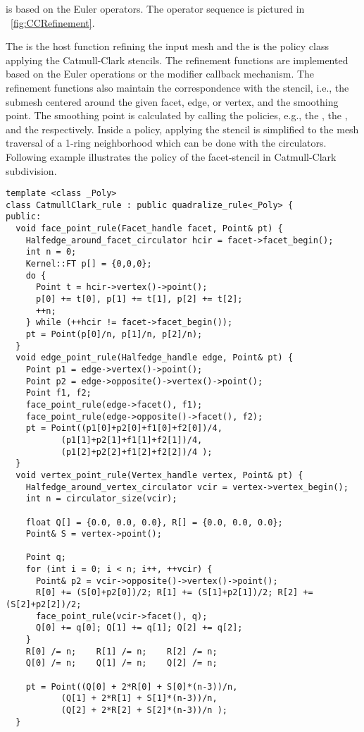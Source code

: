  is based on the Euler
operators. The operator sequence is pictured in 
\figurename\ \ref{fig:CCRefinement}.


The  
is the host function refining the input mesh
and the  is the policy 
class applying the Catmull-Clark stencils.
The refinement functions are implemented based on the
Euler operations or the modifier callback mechanism.
The refinement functions also maintain the 
correspondence with the stencil, i.e., the submesh 
centered around the given facet, edge, or
vertex, and the smoothing point.
The smoothing point is calculated by calling the 
policies, e.g., the , the 
, and the  
respectively. Inside a policy, applying the 
stencil is simplified to the mesh traversal of a 
1-ring neighborhood which can be done with the 
circulators. Following example illustrates  
the policy of the facet-stencil in Catmull-Clark 
subdivision.

\begin{lstlisting}
template <class _Poly>
class CatmullClark_rule : public quadralize_rule<_Poly> {
public:
  void face_point_rule(Facet_handle facet, Point& pt) {
    Halfedge_around_facet_circulator hcir = facet->facet_begin();
    int n = 0;
    Kernel::FT p[] = {0,0,0};
    do {
      Point t = hcir->vertex()->point();
      p[0] += t[0], p[1] += t[1], p[2] += t[2]; 
      ++n;
    } while (++hcir != facet->facet_begin());
    pt = Point(p[0]/n, p[1]/n, p[2]/n);
  }
  void edge_point_rule(Halfedge_handle edge, Point& pt) {
    Point p1 = edge->vertex()->point();
    Point p2 = edge->opposite()->vertex()->point();
    Point f1, f2;
    face_point_rule(edge->facet(), f1);
    face_point_rule(edge->opposite()->facet(), f2);
    pt = Point((p1[0]+p2[0]+f1[0]+f2[0])/4,
	       (p1[1]+p2[1]+f1[1]+f2[1])/4,
	       (p1[2]+p2[2]+f1[2]+f2[2])/4 );
  }
  void vertex_point_rule(Vertex_handle vertex, Point& pt) {
    Halfedge_around_vertex_circulator vcir = vertex->vertex_begin();
    int n = circulator_size(vcir);    

    float Q[] = {0.0, 0.0, 0.0}, R[] = {0.0, 0.0, 0.0};
    Point& S = vertex->point();
    
    Point q;
    for (int i = 0; i < n; i++, ++vcir) {
      Point& p2 = vcir->opposite()->vertex()->point();
      R[0] += (S[0]+p2[0])/2; R[1] += (S[1]+p2[1])/2; R[2] += (S[2]+p2[2])/2;
      face_point_rule(vcir->facet(), q);
      Q[0] += q[0]; Q[1] += q[1]; Q[2] += q[2];
    }
    R[0] /= n;    R[1] /= n;    R[2] /= n;
    Q[0] /= n;    Q[1] /= n;    Q[2] /= n;
      
    pt = Point((Q[0] + 2*R[0] + S[0]*(n-3))/n,
	       (Q[1] + 2*R[1] + S[1]*(n-3))/n,
	       (Q[2] + 2*R[2] + S[2]*(n-3))/n );
  }
\end{lstlisting}

